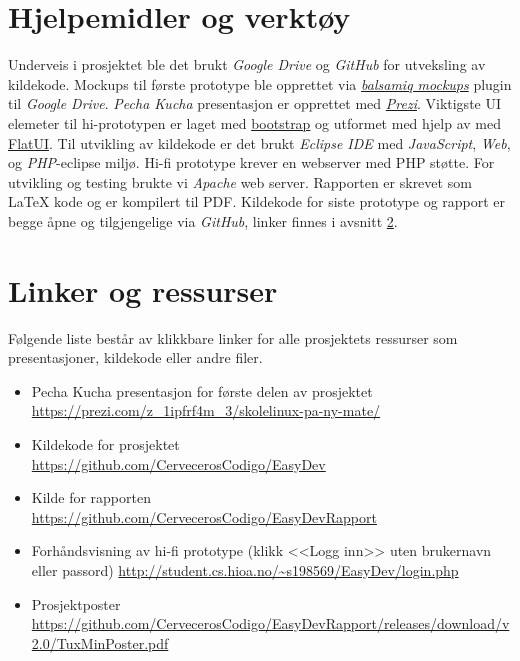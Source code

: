 \section{Hjelpemidler og verktøy} \label{sec:hjelpogverkt}
Underveis i prosjektet ble det brukt \textit{Google Drive} og \textit{GitHub} for utveksling av kildekode. Mockups til første prototype ble opprettet via \href{https://balsamiq.com/}{\textit{balsamiq mockups}} plugin til \textit{Google Drive}. \textit{Pecha Kucha} presentasjon er opprettet med \href{https://prezi.com/z_1ipfrf4m_3/skolelinux-pa-ny-mate/}{\textit{Prezi}}. Viktigste UI elemeter til hi-prototypen er laget med \href{http://getbootstrap.com/}{bootstrap} og utformet med hjelp av med \href{http://designmodo.github.io/Flat-UI/}{FlatUI}. Til utvikling av kildekode er det brukt \textit{Eclipse IDE} med \textit{JavaScript}, \textit{Web}, og \textit{PHP}-eclipse miljø. Hi-fi prototype krever en webserver med PHP støtte. For utvikling og testing brukte vi \textit{Apache} web server.
Rapporten er skrevet som \LaTeX{} kode og er kompilert til PDF.
Kildekode for siste prototype og rapport er begge åpne og tilgjengelige via \textit{GitHub}, linker finnes i avsnitt \ref{sec:linker}.

\section{Linker og ressurser} \label{sec:linker}
Følgende liste består av klikkbare linker for alle prosjektets ressurser som presentasjoner, kildekode eller andre filer. 
\begin{itemize}
\item Pecha Kucha presentasjon for første delen av prosjektet\\ \url{https://prezi.com/z_1ipfrf4m_3/skolelinux-pa-ny-mate/}
\item Kildekode for prosjektet\\
\url{https://github.com/CervecerosCodigo/EasyDev}
\item Kilde for rapporten\\
\url{https://github.com/CervecerosCodigo/EasyDevRapport}
\item Forhåndsvisning av hi-fi prototype (klikk <<Logg inn>> uten brukernavn eller passord)
\url{http://student.cs.hioa.no/~s198569/EasyDev/login.php}
\item Prosjektposter\\
\url{https://github.com/CervecerosCodigo/EasyDevRapport/releases/download/v2.0/TuxMinPoster.pdf}
\end{itemize}